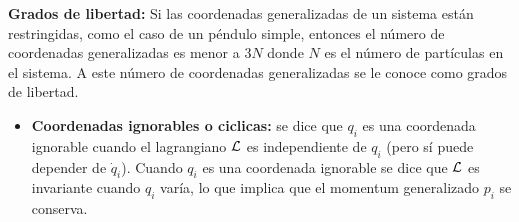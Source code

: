 \textbf{Grados de libertad:} Si las coordenadas generalizadas de un 
sistema están restringidas, como el caso de un péndulo simple, entonces
el número de coordenadas generalizadas es menor a $3N$ donde $N$ es
el número de partículas en el sistema. A este número de coordenadas
generalizadas se le conoce como grados de libertad.

\begin{itemize}
\item \textbf{Coordenadas ignorables o ciclicas:} se dice que $q_i$ es 
una coordenada ignorable cuando el lagrangiano $\mathcal{L}$ es independiente
de $q_i$ (pero sí puede depender de $\dot{q}_i$). Cuando $q_i$ es 
una coordenada ignorable se dice que $\mathcal{L}$ es invariante cuando 
$q_i$ varía, lo que implica que el momentum generalizado $p_i$ se 
conserva.
\end{itemize}
